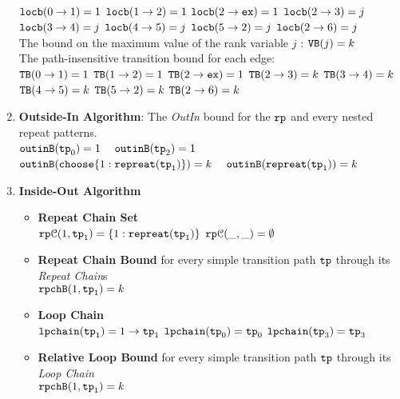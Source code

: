 \begin{enumerate}
      \\  
      $\mathtt{locb}(0 \to 1) = 1$ 
      \quad $\mathtt{locb}(1 \to 2) = 1$
      \quad $\mathtt{locb}(2 \to \mathtt{ex}) = 1$
      \quad $\mathtt{locb}(2 \to 3) = j$ 
      \quad $\mathtt{locb}(3 \to 4) = j$
      \quad $\mathtt{locb}(4 \to 5) = j$ 
      \quad $\mathtt{locb}(5 \to 2) = j$ 
      \quad $\mathtt{locb}(2 \to 6) = j$ 
  \\
  The bound on the maximum value of the rank variable $j$ : ${\mathtt{VB}}(j) = k$
  \\
  The path-insensitive transition bound for each edge:
  \\
  ${\mathtt{TB}}(0 \to 1) = 1$ 
  \quad ${\mathtt{TB}}(1 \to 2) = 1$
  \quad ${\mathtt{TB}}(2 \to \mathtt{ex}) = 1$ 
  \quad ${\mathtt{TB}}(2 \to 3) = k$ 
  \quad ${\mathtt{TB}}(3 \to 4) = k$
  \quad ${\mathtt{TB}}(4 \to 5) = k$ 
  \quad ${\mathtt{TB}}(5 \to 2) = k$ 
  \quad ${\mathtt{TB}}(2 \to 6) = k$ 
  \item \textbf{Outside-In Algorithm}: The \emph{OutIn} bound for the $\mathtt{rp}$ and every nested repeat patterns.
  \\
  $\mathtt{outinB}(\mathtt{tp}_0) = 1$
  ~
  $\mathtt{outinB}(\mathtt{tp}_2) = 1$
  ~
  $\outinB(\rpchoose{1: \rprepeat(\tpath_1)}) = k $
  ~
  $\mathtt{outinB}(\mathtt{repreat}(\mathtt{tp}_1)) = k $
  \item \textbf{Inside-Out Algorithm}
  \begin{itemize}
    \item \textbf{Repeat Chain Set}
    \\
    $\mathtt{rp}\mathcal{C}(1, \mathtt{tp}_1) = \{1: \mathtt{repreat}(\mathtt{tp}_1)\}$ 
    \quad
    $\mathtt{rp}\mathcal{C}(\_, \_) = \emptyset$ 
    \item \textbf{Repeat Chain Bound} for every simple transition path $\mathtt{tp}$ through its \emph{Repeat Chain}s
    \\
    $\mathtt{rpchB}(1, \mathtt{tp}_1) = k$
    \item \textbf{Loop Chain}
    \\
    $\mathtt{lpchain}(\mathtt{tp}_1) = 1\to \mathtt{tp}_1$ \quad
    $\mathtt{lpchain}(\mathtt{tp}_0) = \mathtt{tp}_0$ \quad
    $\mathtt{lpchain}(\mathtt{tp}_3) = \mathtt{tp}_3$ 
    \item \textbf{{Relative Loop Bound}} for every simple transition path $\mathtt{tp}$ through its \emph{Loop Chain}
    \\
    $\mathtt{rpchB}(1, \mathtt{tp}_1) =   k$

\end{itemize}
\end{enumerate}
